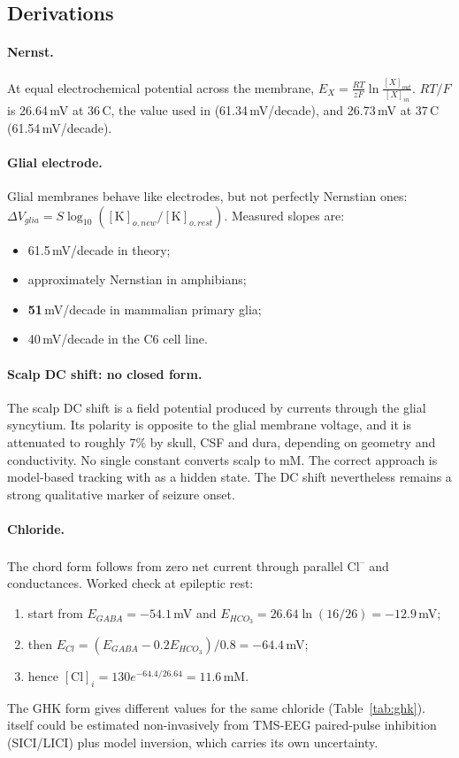 \subsection{Derivations}

\paragraph{Nernst.} At equal electrochemical potential across the membrane, $E_X = \frac{RT}{zF}\ln\frac{[X]_{out}}{[X]_{in}}$. $RT/F$ is 26.64\,mV at 36\,\textdegree C, the value used in \cite{cressman2009} (61.34\,mV/decade), and 26.73\,mV at 37\,\textdegree C (61.54\,mV/decade).

\paragraph{Glial electrode.} Glial membranes behave like \Kp{} electrodes, but not perfectly Nernstian ones: $\Delta V_{glia} = S\log_{10}([\mathrm K]_{o,new}/[\mathrm K]_{o,rest})$. Measured slopes are:
\begin{itemize}
\item 61.5\,mV/decade in theory;
\item approximately Nernstian in amphibians;
\item \textbf{51}\,mV/decade in mammalian primary glia;
\item 40\,mV/decade in the C6 cell line.
\end{itemize}

\paragraph{Scalp DC shift: no closed form.} The scalp DC shift is a field potential produced by currents through the glial syncytium. Its polarity is opposite to the glial membrane voltage, and it is attenuated to roughly 7\% by skull, CSF and dura, depending on geometry and conductivity. No single constant converts scalp \uV{} to mM. The correct approach is model-based tracking with \Ko{} as a hidden state. The DC shift nevertheless remains a strong qualitative marker of seizure onset.

\paragraph{Chloride.} The chord form follows from zero net current through parallel Cl\textsuperscript{--} and \HCO{} conductances. Worked check at epileptic rest:
\begin{enumerate}
\item start from $E_{GABA}=-54.1$\,mV and $E_{HCO_3}=26.64\ln(16/26)=-12.9$\,mV;
\item then $E_{Cl}=(E_{GABA}-0.2E_{HCO_3})/0.8=-64.4$\,mV;
\item hence $[\mathrm{Cl}]_i = 130e^{-64.4/26.64}=11.6$\,mM.
\end{enumerate}
The GHK form gives different values for the same chloride (Table~\ref{tab:ghk}). \EGABA{} itself could be estimated non-invasively from TMS-EEG paired-pulse inhibition (SICI/LICI) plus model inversion, which carries its own uncertainty.


